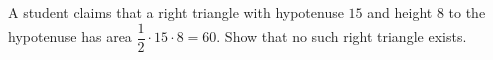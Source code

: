 A student claims that a right triangle with hypotenuse $15$ and height $8$ to the hypotenuse has area $\dfrac{1}{2}\cdot15\cdot8=60$. Show that no such right triangle exists.
